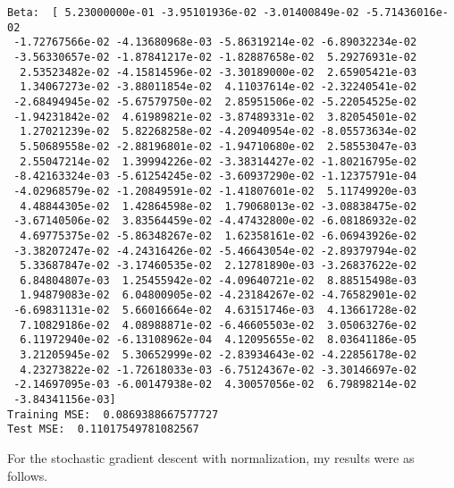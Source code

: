 \documentclass[12pt]{article}
\begin{document}
\begin{verbatim}
Beta:  [ 5.23000000e-01 -3.95101936e-02 -3.01400849e-02 -5.71436016e-02
 -1.72767566e-02 -4.13680968e-03 -5.86319214e-02 -6.89032234e-02
 -3.56330657e-02 -1.87841217e-02 -1.82887658e-02  5.29276931e-02
  2.53523482e-02 -4.15814596e-02 -3.30189000e-02  2.65905421e-03
  1.34067273e-02 -3.88011854e-02  4.11037614e-02 -2.32240541e-02
 -2.68494945e-02 -5.67579750e-02  2.85951506e-02 -5.22054525e-02
 -1.94231842e-02  4.61989821e-02 -3.87489331e-02  3.82054501e-02
  1.27021239e-02  5.82268258e-02 -4.20940954e-02 -8.05573634e-02
  5.50689558e-02 -2.88196801e-02 -1.94710680e-02  2.58553047e-03
  2.55047214e-02  1.39994226e-02 -3.38314427e-02 -1.80216795e-02
 -8.42163324e-03 -5.61254245e-02 -3.60937290e-02 -1.12375791e-04
 -4.02968579e-02 -1.20849591e-02 -1.41807601e-02  5.11749920e-03
  4.48844305e-02  1.42864598e-02  1.79068013e-02 -3.08838475e-02
 -3.67140506e-02  3.83564459e-02 -4.47432800e-02 -6.08186932e-02
  4.69775375e-02 -5.86348267e-02  1.62358161e-02 -6.06943926e-02
 -3.38207247e-02 -4.24316426e-02 -5.46643054e-02 -2.89379794e-02
  5.33687847e-02 -3.17460535e-02  2.12781890e-03 -3.26837622e-02
  6.84804807e-03  1.25455942e-02 -4.09640721e-02  8.88515498e-03
  1.94879083e-02  6.04800905e-02 -4.23184267e-02 -4.76582901e-02
 -6.69831131e-02  5.66016664e-02  4.63151746e-03  4.13661728e-02
  7.10829186e-02  4.08988871e-02 -6.46605503e-02  3.05063276e-02
  6.11972940e-02 -6.13108962e-04  4.12095655e-02  8.03641186e-05
  3.21205945e-02  5.30652999e-02 -2.83934643e-02 -4.22856178e-02
  4.23273822e-02 -1.72618033e-03 -6.75124367e-02 -3.30146697e-02
 -2.14697095e-03 -6.00147938e-02  4.30057056e-02  6.79898214e-02
 -3.84341156e-03]
Training MSE:  0.0869388667577727
Test MSE:  0.11017549781082567
\end{verbatim}
\normalsize
For the stochastic gradient descent with normalization, my results were as follows.
\scriptsize
\end{document}
